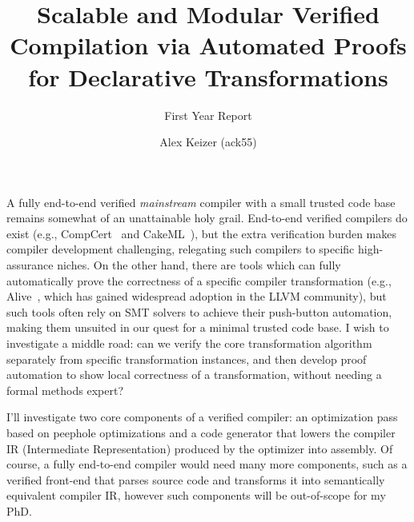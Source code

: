 \documentclass[a4paper]{scrartcl}
\begin{document}
\title{Scalable and Modular Verified Compilation via Automated Proofs
for Declarative
Transformations}
\subtitle{First Year Report}

\author{Alex Keizer \small{(ack55)}}
\date{}



\maketitle

A fully end-to-end verified \emph{mainstream} compiler with a small
trusted code base remains somewhat of an unattainable holy grail.
End-to-end verified compilers do exist (e.g., CompCert~\cite{leroyCompCertFormallyVerified} and CakeML~\cite{kumarCakeMLVerifiedImplementation2014}), but the extra
verification burden makes compiler development challenging, relegating
such compilers to specific high-assurance niches. On the other hand,
there are tools which can fully automatically prove the correctness of a
specific compiler transformation (e.g., Alive~\cite{lopesAlive2BoundedTranslation2021}, which has gained
widespread adoption in the LLVM community), but such tools
often rely on SMT solvers to achieve their push-button automation,
making them unsuited in our quest for a minimal trusted code base. I
wish to investigate a middle road: can we verify the core transformation
algorithm separately from specific transformation instances, and then
develop proof automation to show local
correctness of a transformation, without needing a formal methods expert?

I'll investigate two core components of a verified compiler:
an optimization pass based on peephole optimizations and a code
generator that lowers the compiler IR (Intermediate Representation)
produced by the optimizer into assembly. Of course, a fully end-to-end
compiler would need many more components, such as a verified front-end
that parses source code and transforms it into semantically equivalent
compiler IR, however such components will be out-of-scope for my PhD.
\end{document}
